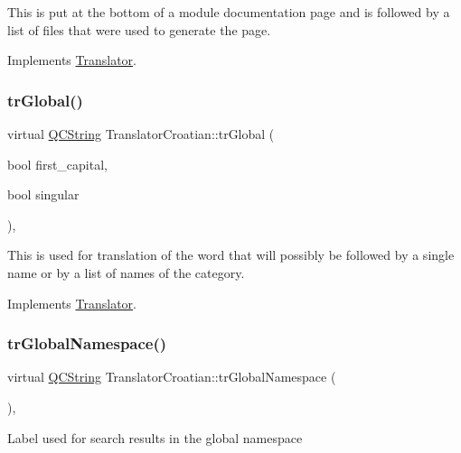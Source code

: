 This is put at the bottom of a module documentation page and is followed by a list of files that were used to generate the page. 

Implements \mbox{\hyperlink{class_translator}{Translator}}.

\mbox{\label{class_translator_croatian_ac79f4973d82c456a82fbc39585350c3d}} 
\subsubsection{\texorpdfstring{trGlobal()}{trGlobal()}}
{\footnotesize\ttfamily virtual \mbox{\hyperlink{class_q_c_string}{Q\+C\+String}} Translator\+Croatian\+::tr\+Global (\begin{DoxyParamCaption}\item[{bool}]{first\+\_\+capital,  }\item[{bool}]{singular }\end{DoxyParamCaption})\hspace{0.3cm}{\ttfamily [inline]}, {\ttfamily [virtual]}}

This is used for translation of the word that will possibly be followed by a single name or by a list of names of the category. 

Implements \mbox{\hyperlink{class_translator}{Translator}}.

\mbox{\label{class_translator_croatian_a6ab170ee62500c65bdee276622b99e25}} 
\subsubsection{\texorpdfstring{trGlobalNamespace()}{trGlobalNamespace()}}
{\footnotesize\ttfamily virtual \mbox{\hyperlink{class_q_c_string}{Q\+C\+String}} Translator\+Croatian\+::tr\+Global\+Namespace (\begin{DoxyParamCaption}{ }\end{DoxyParamCaption})\hspace{0.3cm}{\ttfamily [inline]}, {\ttfamily [virtual]}}

Label used for search results in the global namespace 

